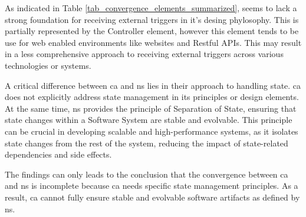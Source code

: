 As indicated in Table \ref{tab_convergence_elements_summarized}, seems to lack a strong
foundation for receiving external triggers in it's desing phylosophy. This is partially
represented by the Controller element, however this element tends to be use for web
enabled environments like websites and Restful APIs. This may result in a less
comprehensive approach to receiving external triggers across various technologies or
systems.

A critical difference between \gls{ca} and \gls{ns} lies in their approach to handling
state. \gls{ca} does not explicitly address state management in its principles or design
elements. At the same time, \gls{ns} provides the principle of Separation of State,
ensuring that state changes within a Software System are stable and evolvable. This
principle can be crucial in developing scalable and high-performance systems, as it
isolates state changes from the rest of the system, reducing the impact of state-related
dependencies and side effects. 

The findings can only leads to the conclusion that the convergence between \gls{ca} and
\gls{ns} is incomplete because \gls{ca} needs specific state management principles. As a
result, \gls{ca} cannot fully ensure stable and evolvable software artifacts as defined by
\gls{ns}.






